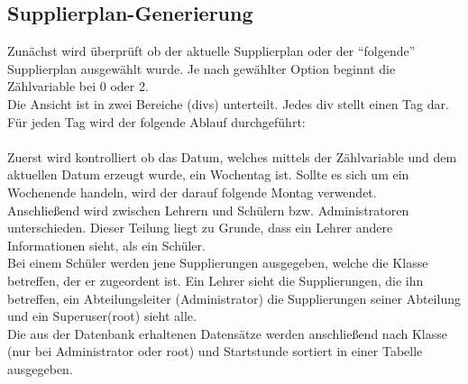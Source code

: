 \subsection{Supplierplan-Generierung}

Zunächst wird überprüft ob der aktuelle Supplierplan oder der \enquote{folgende} Supplierplan ausgewählt wurde. Je nach gewählter Option beginnt die Zählvariable bei 0 oder 2.\\
Die Ansicht ist in zwei Bereiche (divs) unterteilt. Jedes div stellt einen Tag dar.\\
Für jeden Tag wird der folgende Ablauf durchgeführt:\\\\
Zuerst wird kontrolliert ob das Datum, welches mittels der Zählvariable und dem aktuellen Datum erzeugt wurde, ein Wochentag ist. Sollte es sich um ein Wochenende handeln, wird der darauf folgende Montag verwendet.\\
Anschließend wird zwischen Lehrern und Schülern bzw. Administratoren unterschieden. Dieser Teilung liegt zu Grunde, dass ein Lehrer andere Informationen sieht, als ein Schüler.
\\
Bei einem Schüler werden jene Supplierungen ausgegeben, welche die Klasse betreffen, der er zugeordent ist. Ein Lehrer sieht die Supplierungen, die ihn betreffen, ein Abteilungsleiter (Administrator) die Supplierungen seiner Abteilung und ein Superuser(root) sieht alle.\\
Die aus der Datenbank erhaltenen Datensätze werden anschließend nach Klasse (nur bei Administrator oder root) und Startstunde sortiert in einer Tabelle ausgegeben.